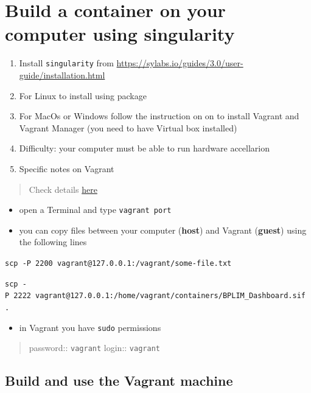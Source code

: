 \documentclass[
  12pt,
]{article}
\providecommand{\tightlist}{%
  \setlength{\itemsep}{0pt}\setlength{\parskip}{0pt}}
\begin{document}
\hypertarget{build-a-container-on-your-computer-using-singularity}{%
\section{Build a container on your computer using
singularity}\label{build-a-container-on-your-computer-using-singularity}}

\begin{enumerate}
\def\labelenumi{\arabic{enumi}.}
\item
  Install \texttt{singularity} from
  \url{https://sylabs.io/guides/3.0/user-guide/installation.html}
\item
  For Linux to install using package
\item
  For MacOs or Windows follow the instruction on on to install Vagrant
  and Vagrant Manager (you need to have Virtual box installed)
\item
  Difficulty: your computer must be able to run hardware accellarion
\item
  Specific notes on Vagrant
\end{enumerate}

\begin{quote}
Check details
\href{https://techtldr.com/how-to-copy-one-file-from-vagrant-virtual-machine-to-local-host/}{here}
\end{quote}

\begin{itemize}
\item
  open a Terminal and type \texttt{vagrant\ port}
\item
  you can copy files between your computer (\textbf{host}) and Vagrant
  (\textbf{guest}) using the following lines
\end{itemize}

\texttt{scp\ -P\ 2200\ vagrant@127.0.0.1:/vagrant/some-file.txt}

\texttt{scp\ -P\ 2222\ vagrant@127.0.0.1:/home/vagrant/containers/BPLIM\_Dashboard.sif\ .}

\begin{itemize}
\tightlist
\item
  in Vagrant you have \texttt{sudo} permissions
\end{itemize}

\begin{quote}
password:: \texttt{vagrant} login:: \texttt{vagrant}
\end{quote}

\hypertarget{build-and-use-the-vagrant-machine}{%
\subsection{Build and use the Vagrant
machine}\label{build-and-use-the-vagrant-machine}}
\end{document}
